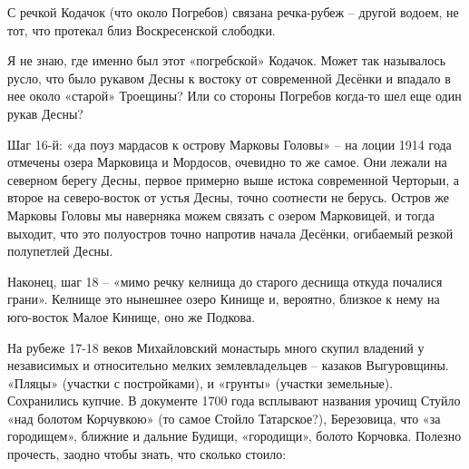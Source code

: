 С речкой Кодачок (что около Погребов) связана речка-рубеж – другой водоем, не тот, что протекал близ Воскресенской слободки.

Я не знаю, где именно был этот «погребской» Кодачок. Может так называлось русло, что было рукавом Десны к востоку от современной Десёнки и впадало в нее около «старой» Троещины? Или со стороны Погребов когда-то шел еще один рукав Десны?


Шаг 16-й: «да поуз мардасов к острову Марковы Головы» – на лоции 1914 года отмечены озера Марковица и Мордосов, очевидно то же самое. Они лежали на северном берегу Десны, первое примерно выше истока современной Черторыи, а второе на северо-восток от устья Десны, точно соотнести не берусь. Остров же Марковы Головы мы наверняка можем связать с озером Марковицей, и тогда выходит, что это полуостров точно напротив начала Десёнки, огибаемый резкой полупетлей Десны.

Наконец, шаг 18 – «мимо речку келнища до старого деснища откуда почалися грани». Келнище это нынешнее озеро Кинище и, вероятно, близкое к нему на юго-восток Малое Кинище, оно же Подкова. 

На рубеже 17-18 веков Михайловский монастырь много скупил владений у независимых и относительно мелких землевладельцев – казаков Выгуровщины. «Пляцы» (участки с постройками), и «грунты» (участки земельные). Сохранились купчие. В документе 1700 года всплывают названия урочищ Стуйло «над болотом Корчувкою» (то самое Стойло Татарское?), Березовица, что «за городищем», ближние и дальние Будищи, «городищи», болото Корчовка. Полезно прочесть, заодно чтобы знать, что сколько стоило\cite{mihdocs}:

